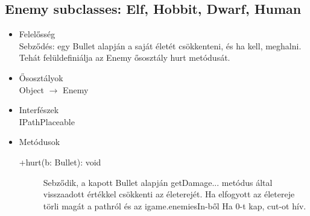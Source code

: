 \subsection{Enemy subclasses: Elf, Hobbit, Dwarf, Human}
\begin{itemize}
\item Felelősség\\
Sebződés: egy Bullet alapján a saját életét csökkenteni, és ha kell, meghalni. Tehát felüldefiniálja az Enemy ősosztály hurt metódusát.
\item Ősosztályok\\
Object $\rightarrow$ Enemy
\item Interfészek\\
IPathPlaceable

\item Metódusok\\
	\begin{description}
		\item[+hurt(b: Bullet): void] Sebződik, a kapott Bullet alapján getDamage... metódus által visszaadott értékkel csökkenti az életerejét. Ha elfogyott az életereje törli magát a pathról és az igame.enemiesIn-ből Ha 0-t kap, cut-ot hív. 
		
	\end{description}
\end{itemize}



